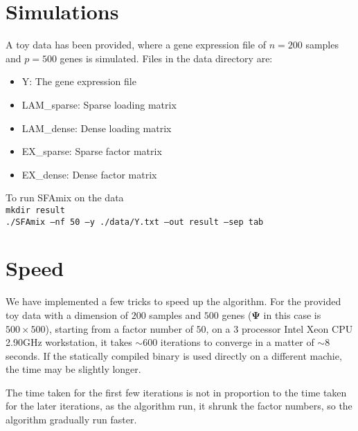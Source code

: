 \documentclass[11pt,a4paper]{article}
\begin{document}
\section{Simulations}
A toy data has been provided, where a gene expression file of
$n=200$ samples and $p=500$ genes is simulated. Files in the data
directory are:
\begin{itemize}
\item
Y: The gene expression file
\item
LAM\_sparse: Sparse loading matrix
\item
LAM\_dense: Dense loading matrix
\item
EX\_sparse: Sparse factor matrix
\item
EX\_dense: Dense factor matrix 
\end{itemize} 
To run SFAmix on the data\\
\texttt{mkdir result}\\
\texttt{./SFAmix --nf 50 --y ./data/Y.txt --out result --sep tab}   
\section{Speed}
We have implemented a few tricks to speed up the algorithm. For the
provided toy data with a dimension of  $200$ samples and $500$ genes
($\mathbf{\Psi}$ in this case is $500 \times 500$), starting from a
factor number of $50$, on a 3 processor Intel Xeon CPU 2.90GHz
workstation, it takes ${\sim}600$ iterations to converge in a matter
of ${\sim}8$ seconds. If the statically compiled binary is used
directly on a different machie, the time may be slightly longer. 

The time taken for the first few iterations is not in proportion to
the time taken for the later iterations, as the algorithm run, it
shrunk the factor numbers, so the algorithm gradually run faster.  
\end{document}
